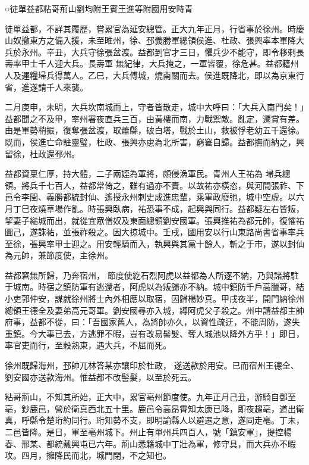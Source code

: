 
\begin{pinyinscope}

 ○徒單益都粘哥荊山劉均附王賓王進等附國用安時青



 徒單益都，不詳其履歷，嘗累官為延安總管。正大九年正月，行省事於徐州。時慶山奴撤東方之備入援，未至睢州，徐、邳義勝軍總領侯進、杜政、張興率本軍降大兵於永州。辛丑，大兵守徐張盆渡。益都到官才三日，懼兵少不能守，即令移剌長壽率甲士千人迎大兵。長壽軍
 無紀律，大兵掩之，一軍皆覆，徐危甚。益都籍州人及運糧埽兵得萬人。乙巳，大兵傅城，燒南關而去。侯進既降北，即以為京東行省，進遂請千人來襲。



 二月庚申，未明，大兵坎南城而上，守者皆散走，城中大呼曰：「大兵入南門矣！」益都聞之不及甲，率州署夜直兵三百，由黃樓而南，力戰禦敵。亂定，遷賞有差。由是軍勢稍振，復奪張盆渡，取蕭縣，破白塔，戰於土山，救被俘老幼五千還徐。既而，侯進亡命駐靈璧，杜政、張興亦慮為北所害，窮窘自歸。益都撫而納之，興留徐，杜政還邳州。



 益都資稟仁厚，持大體，二子兩姪為軍將，頗侵漁軍民。青州人王祐為
 埽兵總領。將兵千七百人，益都常倚之，雖有過亦不責。以故祐亦橫恣，與河間張祚、下邑令李閏、義勝都統封仙、遙授永州刺史成進忠輩，乘軍政廢弛，城中空虛。以六月丁巳夜燒草場作亂。時張興臥病，祐恐事不成，起興與同行。益都疑左右皆叛，挈妻子縋城而出，就從宜眾僧奴及東面總領劉安國軍。張興推祐為都元帥，復懼祐圖己，遂誅祐，並張祚殺之。因大掠城中。壬戌，國用安以行山東路尚書省事率兵至徐，張興率甲士迎之。用安輕騎而入，執興與其黨十餘人，斬之于市，遂以封仙為元帥，兼節度使，主徐州。



 益都窘無所歸，乃奔宿州，
 節度使紇石烈阿虎以益都為人所逐不納，乃與諸將駐于城南。時宿之鎮防軍有逃還者，阿虎以為叛歸亦不納。城中鎮防千戶高臘哥，結小吏郭仲安，謀就徐州將士內外相應以取宿，因歸楊妙真。甲戌夜半，開門納徐州總領王德全及妻弟高元哥軍。劉安國尋亦入城，縛阿虎父子殺之。州中請益都主帥府事，益都不從，曰：「吾國家舊人，為將帥亦久，以資性疏迂，不能周防，遂失重鎮。今大事已去，方逃罪不暇，豈有改易髻髮、奪人城池以降外方乎！」即日，率官吏而行，至穀熟東，遇大兵，不屈而死。



 徐州既歸海州，邳帥兀林答某亦讓印於杜政，
 遂送款於用安。已而宿州王德全、劉安國亦送款海州。惟益都不改髻髮，以至於死云。



 粘哥荊山，不知其所始，正大中，累官亳州節度使。九年正月己丑，游騎自鄧至亳，鈔鹿邑，營於衛真西北五十里。鹿邑令高昂霄知太康已降，即夜趨亳，道出衛真，呼縣令楚珩約同行。珩知勢不支，即明諭縣人以避遷之意，遂同走亳。丁未，二邑皆降。是日，軍至亳州城下。州止有單州兵四百人，號「鎮安軍」，提控楊春、邢某、都統戴興屯已六年。荊山悉籍城中丁壯為軍，修守具，而大兵亦不暇攻。四月，擁降民而北，城門閉，不之知也。




\end{pinyinscope}
